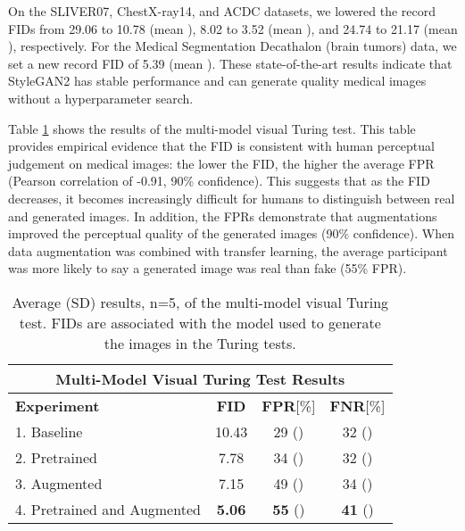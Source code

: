 \documentclass[runningheads]{llncs}
\begin{document}
On the SLIVER07, ChestX-ray14, and ACDC datasets, we lowered the record FIDs from 29.06 to 10.78 (mean ), 8.02 to 3.52 (mean ), and 24.74 to 21.17 (mean ), respectively.
For the Medical Segmentation Decathalon (brain tumors) data, we set a new record FID of 5.39 (mean ).
These state-of-the-art results indicate that StyleGAN2 has stable performance and can generate quality medical images without a hyperparameter search.

Table \ref{tab:fid_fpr} shows the results of the multi-model visual Turing test.
This table provides empirical evidence that the FID is consistent with human perceptual judgement on medical images:
the lower the FID, the higher the average FPR (Pearson correlation of -0.91, 90\% confidence). This suggests that as the FID decreases, it becomes increasingly difficult for humans to distinguish between real and generated images.
In addition, the FPRs demonstrate that augmentations improved the perceptual quality of the generated images (90\% confidence).
When data augmentation was combined with transfer learning, the average participant was more likely to say a generated image was real than fake (55\% FPR).

\begin{table}
    \centering
    \caption{Average (SD) results, n=5, of the multi-model visual Turing test. FIDs are associated with the model used to generate the images in the Turing tests.}
        \begin{tabular}{|l|c|c|c|}
            \multicolumn{4}{c}{\textbf{Multi-Model Visual Turing Test Results}} \\
            \hline
            \textbf{Experiment}
                &\textbf{FID}
                &\textbf{FPR}[\%]
                &\textbf{FNR}[\%]\\
            \hline
            1. Baseline 
                & 10.43
                & 29 ()
                & 32 ()\\
            \hline
            2. Pretrained
                & 7.78
                & 34 ()
                & 32 ()\\
            \hline
            3. Augmented
                & 7.15
                & 49 ()
                & 34 ()\\
            \hline
            4. Pretrained and Augmented
                &\textbf{5.06}
                &\textbf{55} ()
                &\textbf{41} ()\\
            \hline
        \end{tabular}

    \label{tab:fid_fpr}
\end{table}
\end{document}
